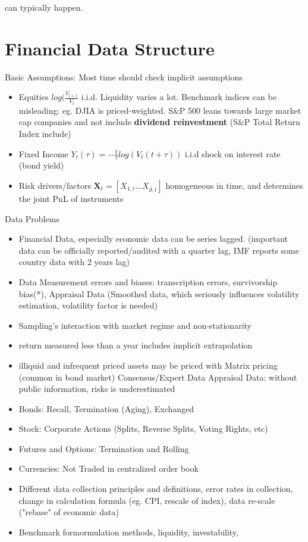 \documentclass[11pt, openany]{book}              %
\begin{document}
can typically happen. 

\section{Financial Data Structure}

Basic Assumptions: Most time should check implicit assumptions

\begin{itemize}
\item Equities $log(\frac{V_{t+1}}{V_t}$ i.i.d. Liquidity varies a lot. Benchmark indices can be misleading: eg. DJIA is priced-weighted. S\&P 500 leans towards large market cap companies and not include \textbf{dividend reinvestment} (S\&P Total Return Index include)
\item Fixed Income $Y_t(\tau) = -\frac{1}{\tau} log(V_t(t+\tau))$ i.i.d shock on interest rate (bond yield)
\item Risk drivers/factors $\mathbf{X}_t = [X_{1,t}...X_{\bar{d},t}]$ homogeneous in time, and determines the joint PnL of instruments

\end{itemize}

Data Problems
\begin{itemize}
 \item Financial Data, especially economic data can be series lagged. (important data can be officially reported/audited with a quarter lag, IMF reports some country data with 2 years lag)
 \item Data Measurement errors and biases: transcription errors, survivorship bias(*), Appraisal Data (Smoothed data, which seriously influences volatility estimation, volatility factor is needed)
 \item Sampling's interaction with market regime and non-stationarity
 \item return measured less than a year includes implicit extrapolation
 \item illiquid and infrequent priced assets may be priced with
 	\subitem Matrix pricing (common in bond market)
 	\subitem Consensus/Expert Data
 	\subitem Appraisal Data: without public information, risks is underestimated 
 \item Bonds: Recall, Termination (Aging), Exchanged
 \item Stock: Corporate Actions (Splits, Reverse Splits, Voting Rights, etc)
 \item Futures and Options: Termination and Rolling
 \item Currencies: Not Traded in centralized order book 
 \item Different data collection principles and definitions, error rates in collection, change in calculation formula (eg. CPI, rescale of index), data re-scale ("rebase" of economic data)
 \item Benchmark formormulation methods, liquidity, investability,
\end{itemize}
\end{document}
